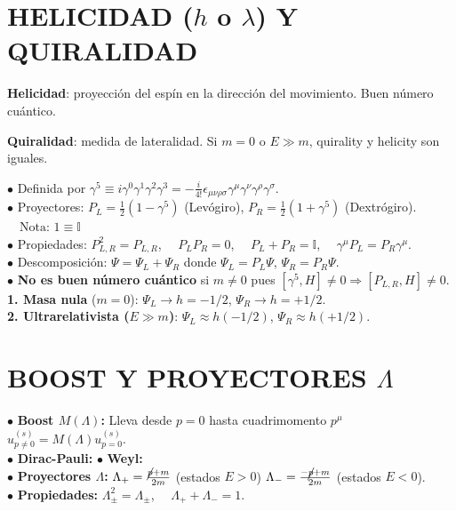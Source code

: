 \section{HELICIDAD ($h$ o $\lambda$) Y QUIRALIDAD}
\textbf{Helicidad}: proyección del espín en la dirección del movimiento. Buen número cuántico.

\textbf{Quiralidad}: medida de lateralidad. Si $m=0$ o $E\gg m$, quirality y helicity son iguales.

$\bullet$ Definida por $\gamma^5 \equiv i\gamma^0\gamma^1\gamma^2\gamma^3 = -\frac{i}{4!} \epsilon_{\mu\nu\rho \sigma}\gamma^\mu \gamma^\nu \gamma^\rho \gamma^\sigma$.\\
$\bullet$ Proyectores: $P_L = \frac{1}{2}(1-\gamma^5)$ (Levógiro), $P_R = \frac{1}{2}(1+\gamma^5)$ (Dextrógiro). $\quad\text{Nota: } 1 \equiv \mathbb{I} $\\
$\bullet$ Propiedades: $P_{L,R}^2 = P_{L,R}$, $\quad P_L P_R = 0$, $\quad P_L + P_R = \mathbb{I}$, $\quad \gamma^\mu P_L= P_R\gamma^\mu$.\\
$\bullet$ Descomposición: $\Psi = \Psi_L + \Psi_R$ donde $\Psi_L = P_L \Psi$, $\Psi_R = P_R \Psi$.\\
    $\bullet$ \textbf{No es buen número cuántico} si $m \neq 0$ pues $[\gamma^5, H] \neq 0 \Rightarrow [P_{L,R}, H] \neq 0$.\\
\textbf{1. Masa nula} ($m=0$): $\Psi_L \to h=-1/2$, $\Psi_R \to h=+1/2$.\\

\textbf{2. Ultrarelativista ($E \gg m$)}: $\Psi_L \approx h(-1/2)$, $\Psi_R \approx h(+1/2)$.


\section{BOOST Y PROYECTORES $\Lambda$}
$\bullet$ \textbf{Boost $M(\Lambda)$:} Lleva desde $p=0$ hasta cuadrimomento $p^\mu$\qquad$u_{p\neq 0}^{(s)} = M(\Lambda) u_{p=0}^{(s)}$.\\
$\bullet$ \textbf{Dirac-Pauli:}
\quad
$\bullet$ \textbf{Weyl:}
\\
$\bullet$ \textbf{Proyectores $\Lambda$:} $\Lambda_+=\frac{\cancel{p}+m}{2m}$ (estados $E>0$) \quad $\Lambda_-=\frac{-\cancel{p}+m}{2m}$ (estados $E<0$).\\
$\bullet$ \textbf{Propiedades:} $\Lambda_{\pm}^2 = \Lambda_{\pm}$, $\quad \Lambda_{+}+ \Lambda_- = 1$.\\



